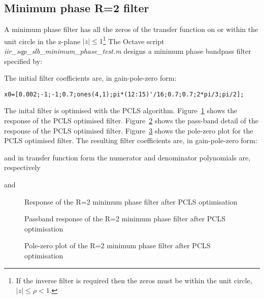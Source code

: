 \documentclass[a4paper,twoside,10pt,english]{report}
\begin{document}
\subsection{Minimum phase R=2 filter}
A minimum phase filter has all the zeros of the transfer function on or within 
the unit circle in the z-plane $\left|z\right|\le 1$\footnote{If the inverse
  filter is required then the zeros must be within the unit circle,
  $\left|z\right|\le \rho < 1$.} The Octave script
\emph{iir\_sqp\_slb\_minimum\_phase\_test.m} designs a minimum phase
bandpass filter specified by:
\begin{small}

\end{small}
The initial filter coefficients are, in gain-pole-zero form:
\begin{small}
\begin{verbatim}
x0=[0.002;-1;-1;0.7;ones(4,1);pi*(12:15)'/16;0.7;0.7;2*pi/3;pi/2];
\end{verbatim}
\end{small}
The inital filter is optimised with the PCLS algorithm.
Figure~\ref{fig:iir-sqp-slb-minimum-phase-pcls-response} shows the response of
the PCLS optimised filter.
Figure~\ref{fig:iir-sqp-slb-minimum-phase-pcls-passband-response} shows the
pass-band detail of the response of the PCLS optimised filter.
Figure~\ref{fig:iir-sqp-slb-minimum-phase-pcls-pz} shows the pole-zero plot for
the PCLS optimised filter. The resulting filter coefficients are, in gain-pole-zero form:
\begin{small}

\end{small}
and in transfer function form the numerator and denominator polynomials are,
respectively
\begin{small}

\end{small}
and
\begin{small}

\end{small}
\begin{figure}[!htbp]
\begin{center}
\scalebox{0.7}{}
\caption{Response of the R=2 minimum phase filter after PCLS optimisation}
\label{fig:iir-sqp-slb-minimum-phase-pcls-response}
\end{center}
\end{figure}
\begin{figure}[!htbp]
\begin{center}
\scalebox{0.7}{}
\caption{Passband response of the R=2 minimum phase filter after PCLS optimisation}
\label{fig:iir-sqp-slb-minimum-phase-pcls-passband-response}
\end{center}
\end{figure}
\begin{figure}[!htbp]
\begin{center}
\scalebox{0.7}{}
\caption{Pole-zero plot of the R=2 minimum phase filter after PCLS optimisation}
\label{fig:iir-sqp-slb-minimum-phase-pcls-pz}
\end{center}
\end{figure}
\clearpage
\end{document}
